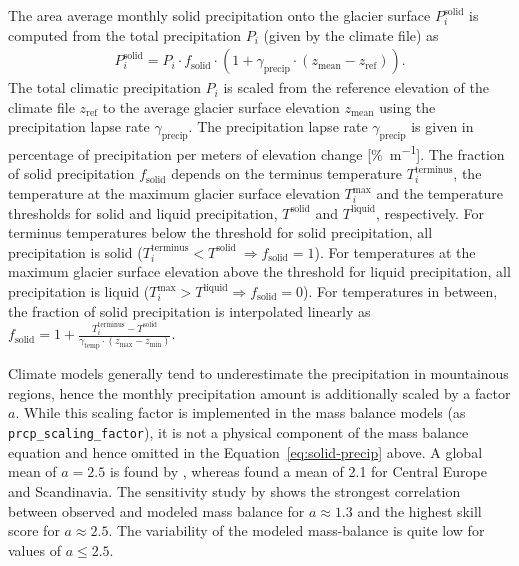         The area average monthly solid precipitation onto the glacier surface $P_i^\text{solid}$ is computed from the total precipitation $P_i$ (given by the climate file) as
        \begin{align}\label{eq:solid-precip}
            P_i^\text{solid} = P_i \cdot f_\text{solid} \cdot (1 + \gamma_\text{precip} \cdot (z_\text{mean} - z_\text{ref})).
        \end{align}
        The total climatic precipitation $P_i$ is scaled from the reference elevation of the climate file $z_\text{ref}$ to the average glacier surface elevation $z_\text{mean}$ using the precipitation lapse rate $\gamma_\text{precip}$. The precipitation lapse rate $\gamma_\text{precip}$ is given in percentage of precipitation per meters of elevation change [\si{\percent\per\meter}]. The fraction of solid precipitation $f_\text{solid}$ depends on the terminus temperature $T_i^\text{terminus}$, the temperature at the maximum glacier surface elevation $T_i^\text{max}$ and the temperature thresholds for solid and liquid precipitation, $T^\text{solid}$ and $T^\text{liquid}$, respectively. For terminus temperatures below the threshold for solid precipitation, all precipitation is solid ($T_i^\text{terminus} < T^\text{solid} \ \Rightarrow f_\text{solid} = 1$). For temperatures at the maximum glacier surface elevation above the threshold for liquid precipitation, all precipitation is liquid ($T_i^\text{max} > T^\text{liquid} \Rightarrow f_\text{solid} = 0$). For temperatures in between, the fraction of solid precipitation is interpolated linearly as $f_\text{solid} = 1 + \frac{T_{i}^\text{terminus} - T^\text{solid}}{\gamma_\text{temp}\cdot(z_\text{max} - z_\text{min})}$.
        
        Climate models generally tend to underestimate the precipitation in mountainous regions, hence the monthly precipitation amount is additionally scaled by a factor $a$. While this scaling factor is implemented in the mass balance models (as \lstinline`prcp_scaling_factor`), it is not a physical component of the  mass balance equation and hence omitted in the Equation~\ref{eq:solid-precip} above. A global mean of $a = 2.5$ is found by \citet{Giesen2012}, whereas \citet{Marzeion2012c} found a mean of 2.1 for Central Europe and Scandinavia. The sensitivity study by \citet{Marzeion2012b} shows the strongest correlation between observed and modeled mass balance for $a \approx 1.3$ and the highest skill score for $a \approx 2.5$. The variability of the modeled mass-balance is quite low for values of $a \leq 2.5$.

